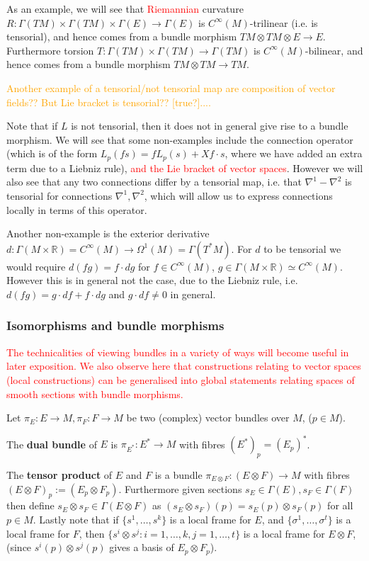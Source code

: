 \documentclass[a4paper]{article}
\theoremstyle{definition} \newtheorem*{definition}{Definition}
\theoremstyle{definition} \newtheorem*{definitions}{Definitions}
\theoremstyle{plain} \newtheorem{theorem}{Theorem}[section]
\theoremstyle{plain} \newtheorem{proposition}[theorem]{Proposition}
\theoremstyle{plain} \newtheorem{corollary}[theorem]{Corollary}
\theoremstyle{plain} \newtheorem{lemma}[theorem]{Lemma}
\theoremstyle{plain} \newtheorem{example}[theorem]{Example}
\newcommand{\checkCorrect}[1]{\textcolor{red}{#1}}
\newcommand{\understandBetter}[1]{\textcolor{orange}{#1}}
\newcommand{\defn}[1]{\textbf{#1}}
\newcommand{\realnos}{\mathbb{R}}
\newcommand{\smooth}{C^\infty}
\begin{document}
As an example, we will see that \checkCorrect{Riemannian} curvature $R:\Gamma(TM)\times \Gamma(TM) \times \Gamma(E)\to \Gamma(E)$ is $\smooth(M)$-trilinear (i.e. is tensorial), and hence comes from a bundle morphism $TM\otimes TM\otimes E\to E$. Furthermore torsion $T:\Gamma(TM)\times \Gamma(TM)\to \Gamma(TM)$ is $\smooth (M)$-bilinear, and hence comes from a bundle morphism $TM\otimes TM\to TM$.

\understandBetter{Another example of a tensorial/not tensorial map are composition of vector fields?? But Lie bracket is tensorial?? [true?]....}

Note that if $L$ is not tensorial, then it does not in general give rise to a bundle morphism. We will see that some non-examples include the connection operator (which is of the form $L_p(fs)=fL_p(s)+X f\cdot s$, where we have added an extra term due to a Liebniz rule), \checkCorrect{and the Lie bracket of vector spaces}. However we will also see that any two connections differ by a tensorial map, i.e. that $\nabla^1-\nabla^2$ is tensorial for connections $\nabla^1, \nabla^2$, which will allow us to express connections locally in terms of this operator. 

Another non-example is the exterior derivative $d:\Gamma(M\times \realnos)=\smooth(M)\to \Omega^1(M)=\Gamma(T^*M)$. For $d$ to be tensorial we would require $d(fg)=f\cdot dg$ for $f\in \smooth(M)$, $g\in \Gamma(M\times \realnos)\simeq \smooth(M)$. However this is in general not the case, due to the Liebniz rule, i.e. $d(fg)=g\cdot df + f\cdot dg$ and $g\cdot df\neq 0$ in general. 


\subsubsection{Isomorphisms and bundle morphisms}
\checkCorrect{The technicalities of viewing bundles in a variety of ways will become useful in later exposition. We also observe here that constructions relating to vector spaces (local constructions) can be generalised into global statements relating spaces of smooth sections with bundle morphisms.}

Let $\pi_E:E\to M, \pi_F:F\to M$ be two (complex) vector bundles over $M$, ($p\in M$).

The \defn{dual bundle} of $E$ is $\pi_{E^\ast}:E^\ast \to M$ with fibres $(E^*)_p = (E_p)^*$.

The \defn{tensor product} of $E$ and $F$ is a bundle $\pi_{E\otimes F}:(E\otimes F) \to M$ with fibres $(E\otimes F)_p:=(E_p \otimes F_p)$. Furthermore given sections $s_E\in \Gamma(E), s_F\in \Gamma(F)$ then define $s_E\otimes s_F\in \Gamma(E\otimes F)$ as $(s_E\otimes s_F)(p)=s_E(p)\otimes s_F(p)$ for all $p\in M$. Lastly note that if $\{s^1, \ldots, s^k\}$ is a local frame for $E$, and $\{\sigma^1,\ldots , \sigma^t\}$ is a local frame for $F$, then $\{s^i\otimes s^j : i=1,\ldots, k, j=1,\ldots , t\}$ is a local frame for $E\otimes F$, (since $s^i(p)\otimes s^j(p)$ gives a basis of $E_p\otimes F_p$).  
\end{document}
